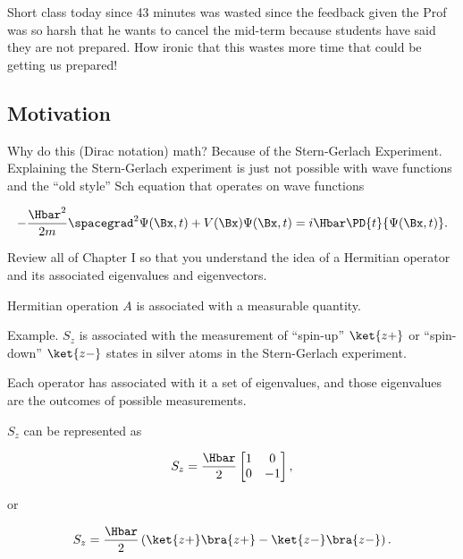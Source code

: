 %
%

Short class today since 43 minutes was wasted since the feedback given the Prof was so harsh that he wants to cancel the mid-term because students have said they are not prepared.  How ironic that this wastes more time that could be getting us prepared!

\subsection{Motivation}

Why do this (Dirac notation) math?  Because of the Stern-Gerlach Experiment.  Explaining the Stern-Gerlach experiment is just not possible with wave functions and the ``old style'' Sch equation that operates on wave functions

\begin{align}\label{eqn:PHY356Foct26:100}
- \frac{\Hbar^2}{2m} \spacegrad^2 \Psi(\Bx,t) + V(\Bx) \Psi(\Bx,t) = i \Hbar \PD{t}{\Psi(\Bx,t)}.
\end{align}

Review all of Chapter I so that you understand the idea of a Hermitian operator and its associated eigenvalues and eigenvectors.

Hermitian operation $A$ is associated with a measurable quantity.

Example.  $S_z$ is associated with the measurement of ``spin-up'' $\ket{z+}$ or ``spin-down'' $\ket{z-}$ states in silver atoms in the Stern-Gerlach experiment.

Each operator has associated with it a set of eigenvalues, and those eigenvalues are the outcomes of possible measurements.

$S_z$ can be represented as

\begin{align}\label{eqn:PHY356Foct26:101}
S_z = \frac{\Hbar}{2}
\begin{bmatrix}
1 & 0 \\
0 & -1
\end{bmatrix},
\end{align}

or

\begin{align}\label{eqn:PHY356Foct26:102}
S_z = \frac{\Hbar}{2}
\left( \ket{z+}\bra{z+} - \ket{z-}\bra{z-} \right).
\end{align}


